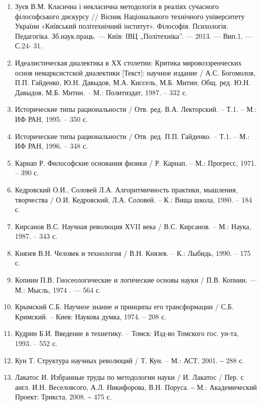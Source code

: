 \begin{enumerate}
\item Зуєв В.М. Класична і некласична методологія в реаліях сучасного
філософського дискурсу // Вісник Національного технічного університету
України «Київський політехнічний інститут». Філософія. Психологія.
Педагогіка. Зб.наук.праць. --- Київ: ІВЦ „Політехніка”. --- 2013. --- Вип.1. --- С.24- 31.

\item Идеалистическая диалектика в ХХ столетии: Критика
мировоззренческих основ немарксистской диалектики [Текст]: научное издание
/ А.С. Богомолов, П.П. Гайденко, Ю.Н. Давыдов, М.А. Киссель, М.Б. Митин;
Общ. ред. Ю.Н. Давыдов, М.Б. Митин. – М.: Политиздат, 1987. – 332 с.

\item Исторические типы рациональности / Отв. ред. В.А. Лекторский. – Т.1. –
М.: ИФ РАН, 1995. – 350 с.

\item Исторические типы рациональности / Отв. ред. П.П. Гайденко. – Т.1. –
М.: ИФ РАН, 1996. – 348 с.

\item Карнап Р. Философские основания физики / Р. Карнап. – М.: Прогресс,
1971. – 390 с.

\item Кедровский О.И., Соловей Л.А. Алгоритмичность практики, мышления,
творчества / О.И. Кедровский, Л.А. Соловей. – К.: Вища школа, 1980. – 184 с.

\item Кирсанов В.С. Научная революция ХVII века / В.С. Кирсанов. – М.:
Наука, 1987. – 343 с.

\item Князев В.Н. Человек и технология / В.Н. Князев. – К.: Лыбидь, 1990. –
175 с.

\item Копнин П.В. Гносеологические и логические основы науки / П.В.
Копнин. --- М.: Мысль, 1974 . --- 564 с.

\item Крымский С.Б. Научное знание и принципы его трансформации / С.Б.
Кримский. – Киев: Наукова думка, 1974. – 208 с.

\item Кудрин Б.И. Введение в технетику. – Томск: Изд-во Томского гос. ун-та,
1993. – 552 с.

\item Кун Т. Структура научных революций / Т. Кун. – М.: АСТ, 2001. ‒ 288 с.

\item Лакатос И. Избранные труды по методологии науки / И. Лакатос / Пер. с
англ. И.Н. Веселовсого, А.Л. Никифорова, В.Н. Поруса. ‒ М.: Академический
Проект: Трикста, 2008. ‒ 475 с.


\end{enumerate}
